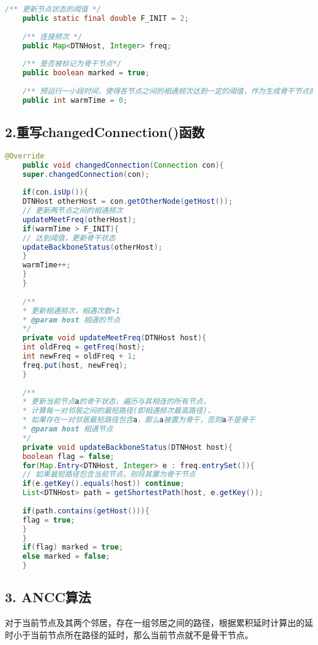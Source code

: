 \documentclass[lang=cn,11pt]{elegantpaper}
\begin{document}
	\begin{lstlisting}[language=Java]
	/** 更新节点状态的阈值 */
	public static final double F_INIT = 2;
	
	/** 连接频次 */
	public Map<DTNHost, Integer> freq;
	
	/** 是否被标记为骨干节点*/
	public boolean marked = true;
	
	/** 预运行一小段时间，使得各节点之间的相遇频次达到一定的阈值，作为生成骨干节点的信息*/
	public int warmTime = 0;
	\end{lstlisting}
	
	\subsection*{2.重写changedConnection()函数}
	
	\begin{lstlisting}[language=Java]
	@Override
	public void changedConnection(Connection con){
	super.changedConnection(con);
	
	if(con.isUp()){
	DTNHost otherHost = con.getOtherNode(getHost());
	// 更新两节点之间的相遇频次
	updateMeetFreq(otherHost);
	if(warmTime > F_INIT){
	// 达到阈值，更新骨干状态
	updateBackboneStatus(otherHost);
	}
	warmTime++;
	}
	}
	
	/**
	* 更新相遇频次，相遇次数+1
	* @param host 相遇的节点
	*/
	private void updateMeetFreq(DTNHost host){
	int oldFreq = getFreq(host);
	int newFreq = oldFreq + 1;
	freq.put(host, newFreq);
	}
	
	/**
	* 更新当前节点a的骨干状态，遍历与其相连的所有节点，
	* 计算每一对邻居之间的最短路径(即相遇频次最高路径)，
	* 如果存在一对邻居最短路径包含a，那么a被置为骨干，否则a不是骨干
	* @param host 相遇节点
	*/
	private void updateBackboneStatus(DTNHost host){
	boolean flag = false;
	for(Map.Entry<DTNHost, Integer> e : freq.entrySet()){
	// 如果最短路径包含当前节点，则将其置为骨干节点
	if(e.getKey().equals(host)) continue;
	List<DTNHost> path = getShortestPath(host, e.getKey());
	
	if(path.contains(getHost())){
	flag = true;
	}
	}
	if(flag) marked = true;
	else marked = false;
	}
	\end{lstlisting}
	
	\subsection*{3. ANCC算法}
	
	对于当前节点及其两个邻居，存在一组邻居之间的路径，根据累积延时计算出的延时小于当前节点所在路径的延时，那么当前节点就不是骨干节点。
	
\end{document}
